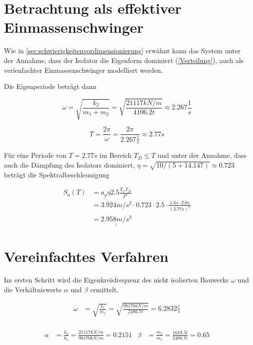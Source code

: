 \pagebreak

\section{Betrachtung als effektiver Einmassenschwinger}

Wie in \cref{sec:schwierigkeitenvordimensionierung} erwähnt kann das System unter der Annahme, dass der Isolator die Eigenform dominiert (\cref{Verteilung}), auch als verienfachter Einmassenschwinger modelliert werden.

Die Eigenperiode beträgt dann

\begin{equation*}
\omega = \sqrt{\frac{k_2}{m_1 + m_2}} = \sqrt{\frac{21117 kN/m}{4106.2 t}} \approx 2.267 \frac{1}{s}
\end{equation*}

\begin{equation*}
T = \frac{2 \pi}{\omega} = \frac{2 \pi}{2.267 \frac{1}{s}} \approx 2.77 s
\end{equation*}

Für eine Periode von $T = 2.77 s$ im Bereich $T_D \leq T$ und unter der Annahme, dass auch die Dämpfung des Isolators dominiert, $\eta=\sqrt{10/(5+14.147)} \approx 0.723$ beträgt die Spektralbeschleunigung

\begin{align*}
S_a(T) &= a_g \eta 2.5 \frac{T_C T_D}{T^2}\\
       &= 3.924 m/s^2 \cdot 0.723 \cdot 2.5 \cdot \frac{1.6 s \cdot 2.0 s}{(2.77 s)^2}\\
       &= \underline{\underline{2.958 m/s^2}}
\end{align*}

\section{Vereinfachtes Verfahren}

Im ersten Schritt wird die Eigenkreisfrequenz des nicht isolierten Bauwerks $\omega$ und die Verhältniswerte $\alpha$ und $\beta$ ermittelt.

\begin{align*}
\omega &= \sqrt{\frac{k_1}{m_1}} = \sqrt{\frac{98170 kN/m}{2486.7 t}} = 6.2832 \frac{1}{s}\\
\end{align*}

\begin{align*}
\alpha &= \frac{k_2}{k_1} = \frac{21117 kN/m}{98170 kN/m} = 0.2151 & \beta  &= \frac{m_2}{m_1} = \frac{1619.5 t}{2486.7 t} = 0.65\\
\end{align*}

